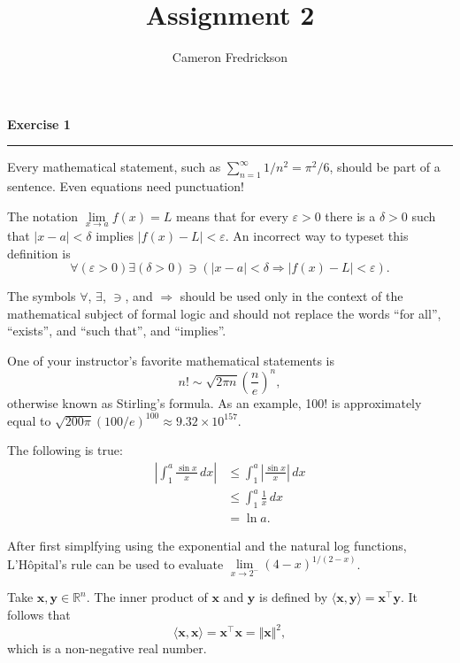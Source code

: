 \documentclass{article}
\title{Assignment 2}
\author{Cameron Fredrickson}
\date{}
\begin{document}
\maketitle

\noindent \textbf{Exercise 1}

\noindent \rule{\textwidth}{.1mm}

Every mathematical statement, such as $ \sum_{n=1}^\infty 1/n^2 = \pi^2/6$, should be part of a sentence. Even equations need punctuation!

The notation $ \lim\limits_{x \rightarrow a} f(x) = L$ means that for every $ \varepsilon > 0$ there is a $ \delta > 0$ such that $|x-a| < \delta$ implies $|f(x)-L| < \varepsilon$. An incorrect way to typeset this definition is \begin{equation*}
\forall \left( \varepsilon > 0 \right) \exists \left( \delta > 0 \right) \ni \left( |x-a| < \delta \Longrightarrow |f(x)-L| < \varepsilon \right).
\end{equation*}

The symbols $\forall$, $\exists$, $\ni$, and $\Longrightarrow$ should be used only in the context of the mathematical subject of formal logic and should not replace the words ``for all'', ``exists'', and ``such that'', and ``implies''.

One of your instructor's favorite mathematical statements is \begin{equation*}
n! \sim \sqrt{2 \pi n} \left( \frac{n}{e} \right)^{n},
\end{equation*} otherwise known as Stirling's formula. As an example,   100! is approximately equal to $ \sqrt{200 \pi} \left( 100/e \right)^{100} \approx 9.32 \times 10^{157}.$

The following is true: \begin{align*}
\left| \int_1^a \frac{\sin x}{x} \, dx\right| &\leq \int_1^a \left|\frac{\sin x}{x}\right| \, dx \\
&\leq \int_1^a \frac{1}{x} \, dx \\
&= \ln a.
\end{align*}

After first simplfying using the exponential and the natural log functions, L'H\^opital's rule can be used to evaluate $ \lim\limits_{x \rightarrow 2^-} (4-x)^{1/(2-x)}$.

Take $\mathbf{x, y} \in \mathbb{R}^n$. The inner product of $\mathbf{x}$ and $\mathbf{y}$ is defined by $\langle \mathbf{x},\mathbf{y} \rangle = \mathbf{x}^\intercal \mathbf{y}$. It follows that \begin{equation*}
\langle \mathbf{x},\mathbf{x} \rangle = \mathbf{x}^\intercal \mathbf{x} = \Vert \mathbf{x} \Vert^2,
\end{equation*} which is a non-negative real number.
\end{document}
